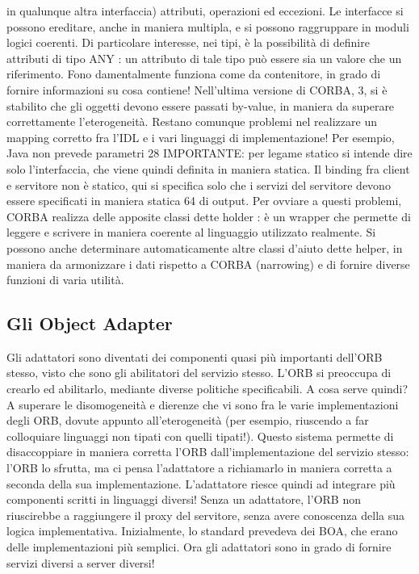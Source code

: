 in qualunque altra interfaccia) attributi, operazioni ed eccezioni. Le interfacce
si possono ereditare, anche in maniera multipla, e si possono raggruppare in
moduli logici coerenti.
Di particolare interesse, nei tipi, è la possibilità di definire attributi di tipo
ANY : un attributo di tale tipo può essere sia un valore che un riferimento. Fono
damentalmente funziona come da contenitore, in grado di fornire informazioni
su cosa contiene! Nell'ultima versione di CORBA, 3, si è stabilito che gli
oggetti devono essere passati by-value, in maniera da superare correttamente
l'eterogeneità.
Restano comunque problemi nel realizzare un mapping corretto fra l'IDL e
i vari linguaggi di implementazione! Per esempio, Java non prevede parametri
28 IMPORTANTE: per legame statico si intende dire solo l'interfaccia, che viene quindi
definita in maniera statica. Il binding fra client e servitore non è statico, qui si specifica solo
che i servizi del servitore devono essere specificati in maniera statica
64
di output. Per ovviare a questi problemi, CORBA realizza delle apposite classi dette holder : è un wrapper che permette
di leggere e scrivere in maniera
coerente al linguaggio utilizzato realmente. Si possono anche determinare automaticamente altre classi d'aiuto dette
helper, in maniera da armonizzare i dati
rispetto a CORBA (narrowing) e di fornire diverse funzioni di varia utilità.
\subsection{Gli Object Adapter}
Gli adattatori sono diventati dei componenti quasi più importanti dell'ORB
stesso, visto che sono gli abilitatori del servizio stesso. L'ORB si preoccupa di
crearlo ed abilitarlo, mediante diverse politiche specificabili.
A cosa serve quindi? A superare le disomogeneità e dierenze che vi sono
fra le varie implementazioni degli ORB, dovute appunto all'eterogeneità (per
esempio, riuscendo a far colloquiare linguaggi non tipati con quelli tipati!).
Questo sistema permette di disaccoppiare in maniera corretta l'ORB dall'implementazione del servizio stesso: l'ORB lo
sfrutta, ma ci pensa l'adattatore a
richiamarlo in maniera corretta a seconda della sua implementazione. L'adattatore riesce quindi ad integrare più
componenti scritti in linguaggi diversi! Senza
un adattatore, l'ORB non riuscirebbe a raggiungere il proxy del servitore, senza
avere conoscenza della sua logica implementativa.
Inizialmente, lo standard prevedeva dei BOA, che erano delle implementazioni più semplici. Ora gli adattatori sono in
grado di fornire servizi diversi a
server diversi!
